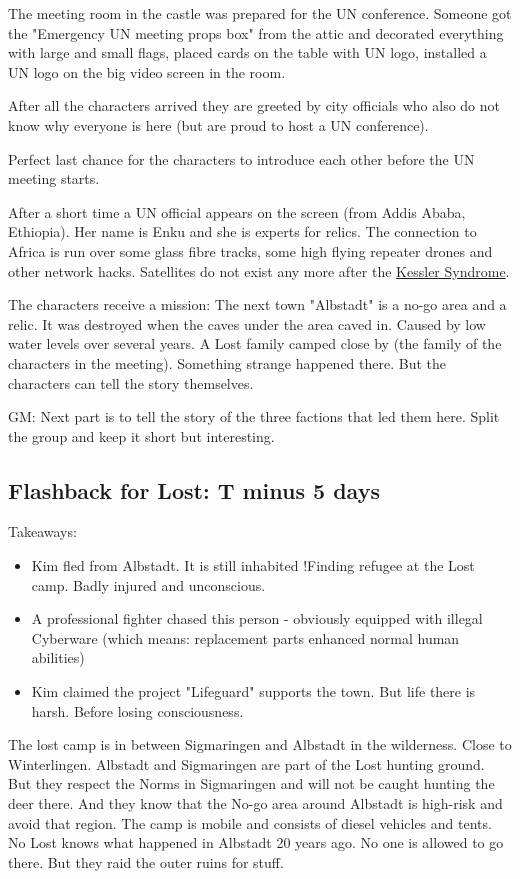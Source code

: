 The meeting room in the castle was prepared for the UN conference. Someone got the "Emergency UN meeting props box" from the attic and decorated everything with large and small flags, placed cards on the table with UN logo, installed a UN logo on the big video screen in the room.

After all the characters arrived they are greeted by city officials who also do not know why everyone is here (but are proud to host a UN conference).

Perfect last chance for the characters to introduce each other before the UN meeting starts.

After a short time a UN official appears on the screen (from Addis Ababa, Ethiopia). Her name is Enku and she is experts for relics.
The connection to Africa is run over some glass fibre tracks, some high flying repeater drones and other network hacks. Satellites do not exist any more after the \hyperref[sec: Kessler Syndrome]{Kessler Syndrome}.

The characters receive a mission:
The next town "Albstadt" is a no-go area and a relic. It was destroyed when the caves under the area caved in. Caused by low water levels over several years. A Lost family camped close by (the family of the characters in the meeting). Something strange happened there. But the characters can tell the story themselves.

GM: Next part is to tell the story of the three factions that led them here. Split the group and keep it short but interesting.

\subsection{Flashback for Lost: T minus 5 days}

Takeaways:

\begin{itemize}
    \item Kim fled from Albstadt. It is still inhabited !Finding refugee at the Lost camp. Badly injured and unconscious.
    \item A professional fighter chased this person - obviously equipped with illegal Cyberware (which means: replacement parts enhanced normal human abilities)
    \item Kim claimed the project "Lifeguard" supports the town. But life there is harsh. Before losing consciousness.
\end{itemize}


The lost camp is in between Sigmaringen and Albstadt in the wilderness. Close to Winterlingen. Albstadt and Sigmaringen are part of the Lost hunting ground. But they respect the Norms in Sigmaringen and will not be caught hunting the deer there. And they know that the No-go area around Albstadt is high-risk and avoid that region. The camp is mobile and consists of diesel vehicles and tents. No Lost knows what happened in Albstadt 20 years ago. No one is allowed to go there. But they raid the outer ruins for stuff.

